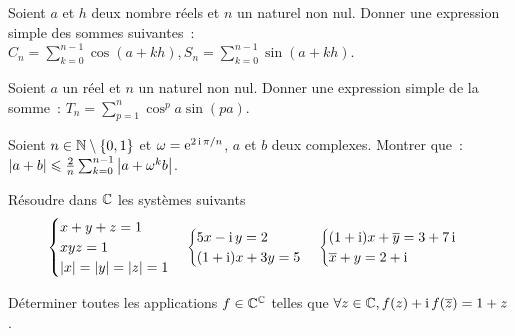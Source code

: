 \begin{exercice}
    Soient \(a\) et \(h\) deux nombre réels et \(n\) un naturel non nul. Donner 
    une expression simple des sommes suivantes~: \( C_n = \sum_{k = 0}^{n-1} 
    \cos(a + kh), S_n = \sum_{k = 0}^{n-1} \sin(a + kh)\).
\end{exercice}

\begin{exercice}
    Soient \(a\) un réel et \(n\) un naturel non nul. Donner une expression 
    simple de la somme~: \(T_n = \sum_{p = 1}^n \cos^p a \sin(pa)\).
\end{exercice}

\begin{exercice}
    Soient \(n \in \mathbb{N}\setminus\{0,1\}\) et \(\omega = \operatorname{e}^{2\operatorname{i}\pi/n}\), \(a\) et 
    \(b\) deux complexes. Montrer que~: \(\left\lvert a + b\right\rvert \leqslant \frac{2}{n} 
    \sum_{k = 0}^{n-1} \left\lvert a + \omega^k b\right\rvert\).
\end{exercice}

\begin{exercice}
    Résoudre dans \(\mathbb{C}\) les systèmes suivants
    \begin{equation}
        \begin{cases} x + y + z = 1 \\ xyz = 1 \\ \left\lvert x\right\rvert = \left\lvert y\right\rvert = \left\lvert z\right\rvert = 
        1 \end{cases}
        \begin{cases} 5x-\operatorname{i}{}y = 2 \\ (1 + \operatorname{i})x + 3y = 5 \end{cases}
        \begin{cases} (1 + \operatorname{i})x + \overline{y} = 3 + 7\operatorname{i} \\\overline{x} + y = 2 + 
        \operatorname{i}\end{cases}
    \end{equation}
\end{exercice}

\begin{exercice}
    Déterminer toutes les applications \(f \in \mathbb{C}^{\mathbb{C}}\) telles que \(\forall z 
    \in \mathbb{C}, f(z) + \operatorname{i} f(\overline{z}) = 1 + z\).
\end{exercice}

